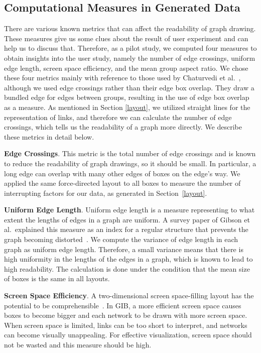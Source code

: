 \documentclass[review]{vgtc}                 %
\begin{document}
\subsection{Computational Measures in Generated Data}
\label{computation}

There are various known metrics that can affect the readability of graph drawing.
These measures give us some clues about the result of user experiment and can help us to discuss that.
Therefore, as a pilot study, we computed four measures to obtain insights into the user study, namely the number of edge crossings, uniform edge length, screen space efficiency, and the mean group aspect ratio.
We chose these four metrics mainly with reference to those used by Chaturvedi et al.~\cite{chaturvedi2014group}, although we used edge crossings rather than their edge box overlap.
They draw a bundled edge for edges between groups, resulting in the use of edge box overlap as a measure.
As mentioned in Section \ref{layout}, we utilized straight lines for the representation of links, and therefore we can calculate the number of edge crossings, which tells us the readability of a graph more directly.
We describe these metrics in detail below.

{\bf Edge Crossings}.
This metric is the total number of edge crossings and is known to reduce the readability of graph drawings, so it should be small.
In particular, a long edge can overlap with many other edges of boxes on the edge's way.
We applied the same force-directed layout to all boxes to measure the number of interrupting factors for our data, as generated in Section~\ref{layout}.

{\bf Uniform Edge Length}.
Uniform edge length is a measure representing to what extent the lengths of edges in a graph are uniform.
A survey paper of Gibson et al.\ explained this measure as an index for a regular structure that prevents the graph becoming distorted~\cite{doi:10.1177/1473871612455749}.
We compute the variance of edge length in each graph as uniform edge length.
Therefore, a small variance means that there is high uniformity in the lengths of the edges in a graph, which is known to lead to high readability.
The calculation is done under the condition that the mean size of boxes is the same in all layouts.

{\bf Screen Space Efficiency}.
A two-dimensional screen space-filling layout has the potential to be comprehensible~\cite{shneiderman1992tree}.
In GIB, a more efficient screen space causes boxes to become bigger and each network to be drawn with more screen space.
When screen space is limited, links can be too short to interpret, and networks can become visually unappealing.
For effective visualization, screen space should not be wasted and this measure should be high.
\end{document}
